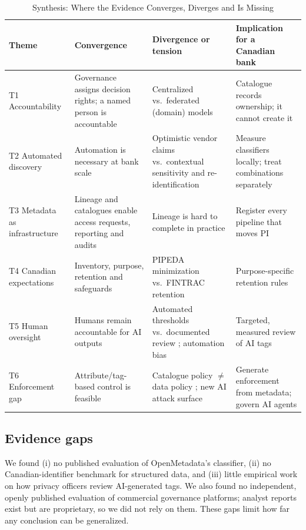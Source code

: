 \documentclass[journal,onecolumn,11pt]{IEEEtran}
\begin{document}
\begin{table}[!t]
\caption{Synthesis: Where the Evidence Converges, Diverges and Is Missing}
\label{tab:synthesis}
\centering\small
\begin{tabularx}{\linewidth}{L{2.7cm} Y Y Y}
\toprule
\textbf{Theme} & \textbf{Convergence} & \textbf{Divergence or tension} & \textbf{Implication for a Canadian bank} \\
\midrule
T1 Accountability & Governance assigns decision rights; a named person is accountable \cite{khatri,abraham,pipeda,iso38505} & Centralized vs.\ federated (domain) models \cite{otto,dehghani} & Catalogue records ownership; it cannot create it \\
T2 Automated discovery & Automation is necessary at bank scale \cite{truong,pat_ibm,pat_bigid} & Optimistic vendor claims vs.\ contextual sensitivity and re-identification \cite{opc_sensitive,sweeney,rocher} & Measure classifiers locally; treat combinations separately \\
T3 Metadata as infrastructure & Lineage and catalogues enable access requests, reporting and audits \cite{labadie,herschel,bcbs239} & Lineage is hard to complete in practice \cite{bcbs_progress} & Register every pipeline that moves PI \\
T4 Canadian expectations & Inventory, purpose, retention and safeguards \cite{opc_consent,osfi_b13,nist_pf} & PIPEDA minimization vs.\ FINTRAC retention \cite{fintrac_records} & Purpose-specific retention rules \\
T5 Human oversight & Humans remain accountable for AI outputs \cite{nist_airmf,iso42001,osfi_e23} & Automated thresholds vs.\ documented review \cite{pat_bigid}; automation bias \cite{parasuraman} & Targeted, measured review of AI tags \\
T6 Enforcement gap & Attribute/tag-based control is feasible \cite{nist800162,pat_hitachi} & Catalogue policy $\neq$ data policy \cite{om_contracts}; new AI attack surface \cite{hou_mcp} & Generate enforcement from metadata; govern AI agents \\
\bottomrule
\end{tabularx}
\end{table}

\subsection{Evidence gaps}
We found (i) no published evaluation of OpenMetadata's classifier, (ii) no Canadian-identifier benchmark for structured data, and (iii) little empirical work on how privacy officers review AI-generated tags. We also found no independent, openly published evaluation of commercial governance platforms; analyst reports exist but are proprietary, so we did not rely on them. These gaps limit how far any conclusion can be generalized.
\end{document}
